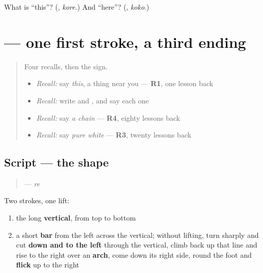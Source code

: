 \begin{tcolorbox}[breakable,colback=teal!4,colframe=teal!35!black,title={Before you move on}]
What is \textquotedblleft{}this\textquotedblright{}? (\textbf{}, \emph{kore}.) And \textquotedblleft{}here\textquotedblright{}? (\textbf{}, \emph{koko}.)
\end{tcolorbox}
\section[\texorpdfstring{\ja{れ} (re)}{れ (re)}]{ — one first stroke, a third ending}

\label{lesson:JA-W132-re}



\begin{quote}
Four recalls, then the sign.

\begin{itemize}
\raggedright
  \item \emph{Recall:} say \emph{this}, a thing near you — \textbf{R1}, one lesson back
  \item \emph{Recall:} write \textbf{} and \textbf{}, and say each one
  \item \emph{Recall:} say \emph{a chain} — \textbf{R4}, eighty lessons back
  \item \emph{Recall:} say \emph{pure white} — \textbf{R3}, twenty lessons back
\end{itemize}
\end{quote}

\subsection*{Script — the shape}

\begin{quote}
\textbf{} — \emph{re}
\end{quote}

Two strokes, one lift:

\begin{enumerate}
\raggedright
  \item the long \textbf{vertical}, from top to bottom
  \item a short \textbf{bar} from the left across the vertical; without lifting, turn sharply and cut \textbf{down and to the left} through the vertical, climb back up that line and rise to the right over an \textbf{arch}, come down its right side, round the foot and \textbf{flick} up to the right
\end{enumerate}

